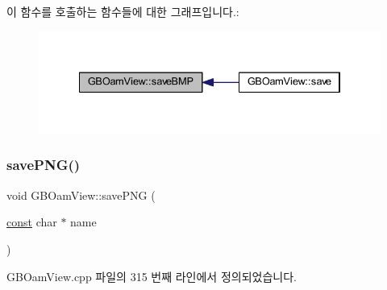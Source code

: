 이 함수를 호출하는 함수들에 대한 그래프입니다.\+:
\nopagebreak
\begin{figure}[H]
\begin{center}
\leavevmode
\includegraphics[width=334pt]{class_g_b_oam_view_a03a02a1b15d607e9891e58695dcfd7dc_icgraph}
\end{center}
\end{figure}
\mbox{\label{class_g_b_oam_view_a06b80040df2b94b034d5b0822ebc27ed}} 
\subsubsection{\texorpdfstring{save\+P\+N\+G()}{savePNG()}}
{\footnotesize\ttfamily void G\+B\+Oam\+View\+::save\+P\+NG (\begin{DoxyParamCaption}\item[{\mbox{\hyperlink{getopt1_8c_a2c212835823e3c54a8ab6d95c652660e}{const}} char $\ast$}]{name }\end{DoxyParamCaption})}



G\+B\+Oam\+View.\+cpp 파일의 315 번째 라인에서 정의되었습니다.


